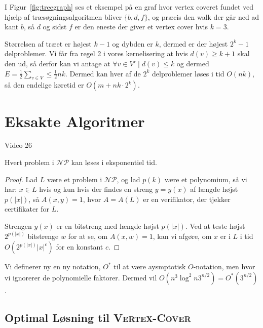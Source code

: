 I Figur~\ref{fig:treegraph} ses et eksempel på en graf hvor vertex coveret fundet ved hjælp af træsøgningsalgoritmen bliver $\{b,d,f\}$, og præcis den walk der går ned ad kant $b$, så $d$ og sidst $f$ er den eneste der giver et vertex cover hvis $k = 3$.

\newpage
Størrelsen af træet er højest $k-1$ og dybden er $k$, dermed er der højest $2^{k}-1$ delproblemer. Vi får fra regel 2 i vores kernelisering at hvis $d(v) \ge k+1$ skal den ud, så derfor kan vi antage at $\forall v \in V' \mid d(v) \le k$ og dermed $E = \frac{1}{2} \sum_{v \in V} \le \frac{1}{2}nk$. Dermed kan hver af de $2^{k}$ delproblemer løses i tid $O(nk)$, så den endelige køretid er $O(m+nk \cdot 2^{k})$.

\section{Eksakte Algoritmer}%
\label{sec:exactalgorithms}

\begin{note}[Kilder]
	Video 26
\end{note}

\begin{theorem}
	Hvert problem i $\mathcal{NP}$ kan løses i eksponentiel tid.
\end{theorem}

\begin{proof}
	Lad $L$ være et problem i $\mathcal{NP}$, og lad $p(k)$ være et polynomium, så vi har: $x \in L$ hvis og kun hvis der findes en streng $y = y(x)$ af længde højst $p(|x|)$, så $A(x,y) = 1$, hvor $A = A(L)$ er en verifikator, der tjekker certifikater for $L$.

	Strengen $y(x)$ er en bitstreng med længde højst $p(|x|)$. Ved at teste højst $2^{p(|x|)}$ bitstrenge $w$ for at se, om $A(x,w) = 1$, kan vi afgøre, om $x$ er i $L$ i tid $O(2^{p(|x|)}|x|^c)$ for en konstant $c$.
\end{proof}

Vi definerer ny en ny notation, $O^{*}$ til at være aysmptotisk $O$-notation, men hvor vi ignorerer de polynomielle faktorer. Dermed vil $O(n^{3}\log^{2}n 3^{n/2}) = O^{*}(3^{n/2})$.

\subsection{Optimal Løsning til \textsc{Vertex-Cover}}%
\label{subsec:vcoptimalexact}



